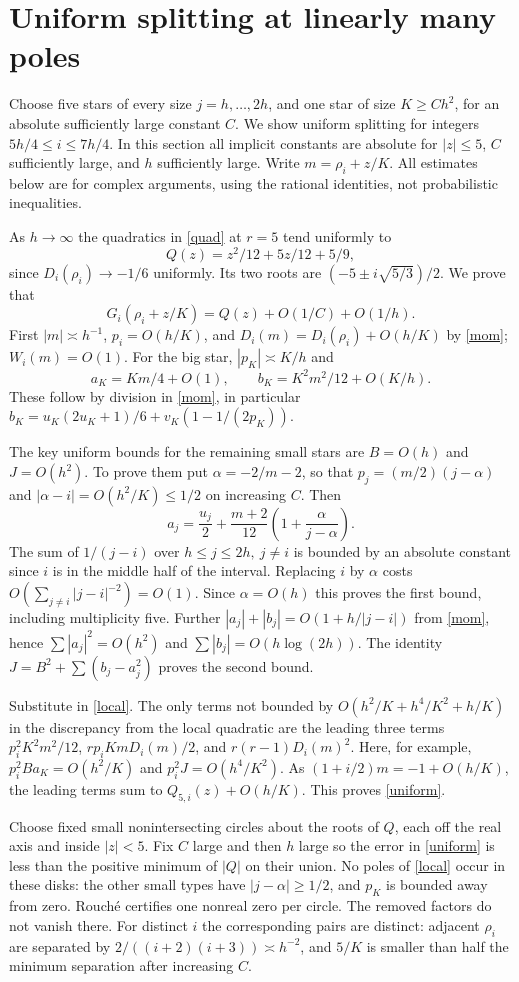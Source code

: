 \documentclass[11pt]{article}
\begin{document}
\section{Uniform splitting at linearly many poles}
Choose five stars of every size $j=h,\ldots,2h$, and one star of size
$K\ge C h^2$, for an absolute sufficiently large constant $C$. We show
uniform splitting for integers $5h/4\le i\le7h/4$. In this section all
implicit constants are absolute for $|z|\le 5$, $C$ sufficiently large,
and $h$ sufficiently large. Write $m=\rho_i+z/K$. All estimates below
are for complex arguments, using the rational identities, not
probabilistic inequalities.

As $h\to\infty$ the quadratics in \eqref{quad} at $r=5$ tend uniformly to
\[
 Q(z)=z^2/12+5z/12+5/9,
\]
since $D_i(\rho_i)\to-1/6$ uniformly. Its two roots are
$(-5\pm i\sqrt{5/3})/2$. We prove that
\begin{equation}\label{uniform}
 G_i(\rho_i+z/K)= Q(z)+O(1/C)+O(1/h).
\end{equation}
First $|m|\asymp h^{-1}$, $p_i=O(h/K)$, and
$D_i(m)=D_i(\rho_i)+O(h/K)$ by \eqref{mom}; $W_i(m)=O(1)$.
For the big star, $|p_K|\asymp K/h$ and
\[
 a_K=Km/4+O(1),\qquad b_K=K^2m^2/12+O(K/h).
\]
These follow by division in \eqref{mom}, in particular
$b_K=u_K(2u_K+1)/6+v_K(1-1/(2p_K))$.

The key uniform bounds for the remaining small stars are
$B=O(h)$ and $J=O(h^2)$. To prove them put
$\alpha=-2/m-2$, so that $p_j=(m/2)(j-\alpha)$ and
$|\alpha-i|=O(h^2/K)\le1/2$ on increasing $C$. Then
\[
 a_j=\frac{u_j}{2}+\frac{m+2}{12}
               \left(1+\frac{\alpha}{j-\alpha}\right).
\]
The sum of $1/(j-i)$ over $h\le j\le2h,\ j\ne i$ is bounded by an
absolute constant since $i$ is in the middle half of the interval.
Replacing $i$ by $\alpha$ costs $O(\sum_{j\ne i}|j-i|^{-2})=O(1)$.
Since $\alpha=O(h)$ this proves the first bound, including multiplicity
five. Further $|a_j|+|b_j|=O(1+h/|j-i|)$ from \eqref{mom}, hence
$\sum |a_j|^2=O(h^2)$ and $\sum |b_j|=O(h\log(2h))$. The identity
$J=B^2+\sum(b_j-a_j^2)$ proves the second bound.

Substitute in \eqref{local}. The only terms not bounded by
$O(h^2/K+h^4/K^2+h/K)$ in the discrepancy from the local quadratic are
the leading three terms
$p_i^2 K^2m^2/12$, $r p_i Km D_i(m)/2$, and $r(r-1)D_i(m)^2$.
Here, for example, $p_i^2Ba_K=O(h^2/K)$ and
$p_i^2J=O(h^4/K^2)$. As
$(1+i/2)m=-1+O(h/K)$, the leading terms sum to
$Q_{5,i}(z)+O(h/K)$. This proves \eqref{uniform}.

Choose fixed small nonintersecting circles about the roots of $Q$, each
off the real axis and inside $|z|<5$. Fix $C$ large and then $h$ large
so the error in \eqref{uniform} is less than the positive minimum of
$|Q|$ on their union. No poles of \eqref{local} occur in these disks:
the other small types have $|j-\alpha|\ge1/2$, and $p_K$ is bounded away
from zero. Rouch\'e certifies one nonreal zero per circle. The removed
factors do not vanish there. For distinct $i$ the corresponding pairs
are distinct: adjacent $\rho_i$ are separated by
$2/((i+2)(i+3))\asymp h^{-2}$, and $5/K$ is smaller than half the
minimum separation after increasing $C$.
\end{document}
